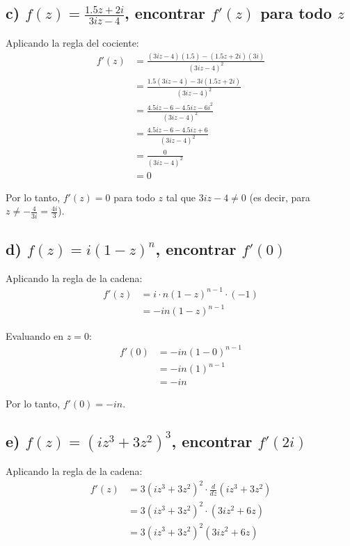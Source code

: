 \documentclass{article}
\begin{document}
\subsection*{c) $f(z) = \frac{1.5z + 2i}{3iz - 4}$, encontrar $f'(z)$ para todo $z$}

Aplicando la regla del cociente:
\begin{align*}
f'(z) &= \frac{(3iz - 4)(1.5) - (1.5z + 2i)(3i)}{(3iz - 4)^2} \\
      &= \frac{1.5(3iz - 4) - 3i(1.5z + 2i)}{(3iz - 4)^2} \\
      &= \frac{4.5iz - 6 - 4.5iz - 6i^2}{(3iz - 4)^2} \\
      &= \frac{4.5iz - 6 - 4.5iz + 6}{(3iz - 4)^2} \\
      &= \frac{0}{(3iz - 4)^2} \\
      &= 0
\end{align*}

Por lo tanto, $f'(z) = 0$ para todo $z$ tal que $3iz - 4 \neq 0$ (es decir, para $z \neq -\frac{4}{3i} = \frac{4i}{3}$).

\subsection*{d) $f(z) = i(1 - z)^n$, encontrar $f'(0)$}

Aplicando la regla de la cadena:
\begin{align*}
f'(z) &= i \cdot n(1 - z)^{n-1} \cdot (-1) \\
      &= -in(1 - z)^{n-1}
\end{align*}

Evaluando en $z = 0$:
\begin{align*}
f'(0) &= -in(1 - 0)^{n-1} \\
      &= -in(1)^{n-1} \\
      &= -in
\end{align*}

Por lo tanto, $f'(0) = -in$.

\subsection*{e) $f(z) = (iz^3 + 3z^2)^3$, encontrar $f'(2i)$}

Aplicando la regla de la cadena:
\begin{align*}
f'(z) &= 3(iz^3 + 3z^2)^2 \cdot \frac{d}{dz}(iz^3 + 3z^2) \\
      &= 3(iz^3 + 3z^2)^2 \cdot (3iz^2 + 6z) \\
      &= 3(iz^3 + 3z^2)^2(3iz^2 + 6z)
\end{align*}
\end{document}
